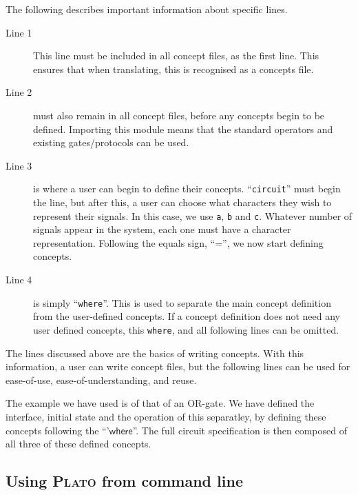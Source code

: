 \documentclass[british,conference,compsoc]{IEEEtran}
\newcommand{\noun}[1]{\textsc{#1}}
\begin{document}
The following describes important information about specific lines.

\begin{description}
  \item [Line 1]
  This line must be included in all concept files, as the first line. This 
  ensures that when translating, this is recognised as a concepts file.
  
  \item [Line 2] must also remain in all concept files, before any concepts 
  begin to be defined. Importing this module means that the standard operators 
  and existing gates/protocols can be used. 
  
  \item [Line 3] is where a user can begin to define their concepts. 
  ``\texttt{circuit}'' must begin the line, but after this, a user can choose 
  what characters they wish to represent their signals. In this case, we use 
  \texttt{a}, \texttt{b} and \texttt{c}. Whatever number of signals appear in 
  the system, each one must have a character representation. Following the 
  equals sign, ``='', we now start defining concepts.
  
  \item [Line 4] is simply ``\texttt{where}''. This is used to separate the main
  concept definition from the user-defined concepts. If a concept definition 
  does not need any user defined concepts, this \texttt{where}, and all 
  following lines can be omitted.

\end{description}

\vspace{-1mm}

The lines discussed above are the basics of writing concepts. With this 
information, a user can write concept files, but the following lines can be 
used for ease-of-use, ease-of-understanding, and reuse. 

The example we have used is of that of an OR-gate. We have defined the 
interface, initial state and the operation of this separatley, by defining 
these concepts following the ``'$\mathsf{where}$''. The full circuit 
specification is then composed of all three of these defined concepts. 

\vspace{-3mm}

\subsection{Using \noun{Plato} from command line}
\end{document}
